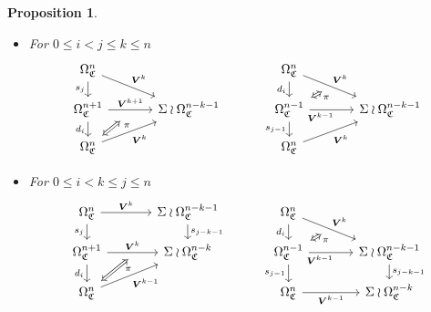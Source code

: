\documentclass[a4paper,10pt
,draft
]{article}%
\numberwithin{equation}{section}
\numberwithin{figure}{section}
\newtheorem{proposition}[equation]{Proposition}%
\theoremstyle{definition} %
\newcommand{\1}{\ensuremath{\mathbbm 1}}%
\begin{document}
\begin{proposition}
\begin{itemize}
		\item[(DF3)]
		For $0\leq i < j \leq k \leq n$
		\begin{equation}
		\begin{tikzcd}[row sep = 12pt, column sep = 35pt]
		\Omega^n_{\mathfrak{C}}
		\arrow{dr}[swap,name=U]{}{\boldsymbol{V}^k} \arrow{d}[swap]{s_j} &
		&
		\Omega^n_{\mathfrak{C}}
		\arrow{dr}[swap,name=UUU]{}{\boldsymbol{V}^k} \arrow{d}[swap]{d_{i}} &
		\\
		|[alias=V]|
		\Omega^{n+1}_{\mathfrak{C}} \ar{r}{\boldsymbol{V}^{k+1}}[swap,name=UU]{} \arrow{d}[swap]{d_i}&
		\Sigma \wr \Omega^{n-k-1}_{\mathfrak{C}}
		&
		|[alias=VVV]|
		\Omega^{n-1}_{\mathfrak{C}} \ar{r}[near start, swap]{\boldsymbol{V}^{k-1}}[swap,name=UUUU]{} \ar{d}[swap]{s_{j-1}} &
		\Sigma \wr \Omega^{n-k-1}_{\mathfrak{C}}
		\\
		|[alias=VV]|
		\Omega^{n}_{\mathfrak{C}} \arrow{ur}[swap]{\boldsymbol{V}^k} &
		&
		|[alias=VVVV]|
		\Omega^{n}_{\mathfrak{C}} \arrow{ur}[swap]{\boldsymbol{V}^k} &
		\arrow[Leftrightarrow, from=VV, to=UU,shorten >=0.25cm,shorten <=0.05cm
		,swap,near end,"\pi"
		]
		\arrow[Leftrightarrow, from=VVV, to=UUU,shorten >=0.05cm,shorten <=0.05cm
		,swap,near end,"\pi"
		]
		\end{tikzcd}
		\end{equation}
		
		\item[(DF4)]
		For $0 \leq i < k \leq j \leq n$
		\begin{equation}
		\begin{tikzcd}[row sep = 12pt, column sep = 35pt]
		\Omega^n_{\mathfrak{C}}
		\arrow{r}[swap,name=U]{}{\boldsymbol{V}^k} \arrow{d}[swap]{s_j} &
		\Sigma \wr \Omega^{n-k-1}_{\mathfrak{C}} \ar{d}{s_{j-k-1}}
		&
		\Omega^n_{\mathfrak{C}}
		\arrow{dr}[swap,name=UUU]{}{\boldsymbol{V}^k} \arrow{d}[swap]{d_i} &
		\\
		|[alias=V]|
		\Omega^{n+1}_{\mathfrak{C}} \ar{r}{\boldsymbol{V}^{k}}[swap,name=UU]{} \arrow{d}[swap]{d_i}&
		\Sigma \wr \Omega^{n-k}_{\mathfrak{C}}
		&
		|[alias=VVV]|
		\Omega^{n-1}_{\mathfrak{C}} \ar{r}[near start, swap]{\boldsymbol{V}^{k-1}}[swap,name=UUUU]{} \ar{d}[swap]{s_{j-1}} &
		\Sigma \wr \Omega^{n-k-1}_{\mathfrak{C}} \ar{d}{s_{j-k-1}}
		\\
		|[alias=VV]|
		\Omega^{n}_{\mathfrak{C}} \arrow{ur}[swap]{\boldsymbol{V}^{k-1}} &
		&
		|[alias=VVVV]|
		\Omega^{n}_{\mathfrak{C}} \ar{r}[swap]{\boldsymbol{V}^{k-1}} &
		\Sigma \wr \Omega^{n-k}_{\mathfrak{C}}
		\arrow[Leftrightarrow, from=VV, to=UU,shorten >=0.05cm,shorten <=0.05cm
		,swap,near end,"\pi"
		]
		\arrow[Leftrightarrow, from=VVV, to=UUU,shorten >=0.05cm,shorten <=0.05cm
		,swap,near end,"\pi"
		]
		\end{tikzcd}
		\end{equation}
	\end{itemize}
\end{proposition}
\end{document}
